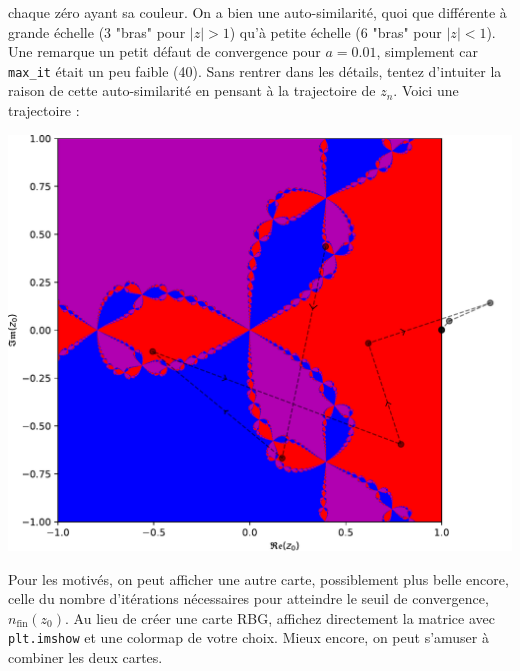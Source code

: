 \documentclass{book}
\newcommand{\inline}[1]{\texttt{#1}}
\begin{document}
\begin{correction}
\begin{center}
\end{center}
chaque zéro ayant sa couleur. On a bien une auto-similarité, quoi que différente à grande échelle (3 "bras" pour $|z|>1$) qu'à petite échelle (6 "bras" pour $|z|<1$). Une remarque un petit défaut de convergence pour $a=0.01$, simplement car \inline{max_it} était un peu faible (40). Sans rentrer dans les détails, tentez d'intuiter la raison de cette auto-similarité en pensant à la trajectoire de $z_n$. Voici une trajectoire :
\begin{center}
\includegraphics[width=0.7\linewidth]{TD2/newton_bassins_converg.a1_and_traj.pdf}
\end{center}
\end{correction}

Pour les motivés, on peut afficher une autre carte, possiblement plus belle encore, celle du nombre d'itérations nécessaires pour atteindre le seuil de convergence, $n_\text{fin}(z_0)$. Au lieu de créer une carte RBG, affichez directement la matrice avec \inline{plt.imshow} et une colormap de votre choix. Mieux encore, on peut s'amuser à combiner les deux cartes.
\end{document}
